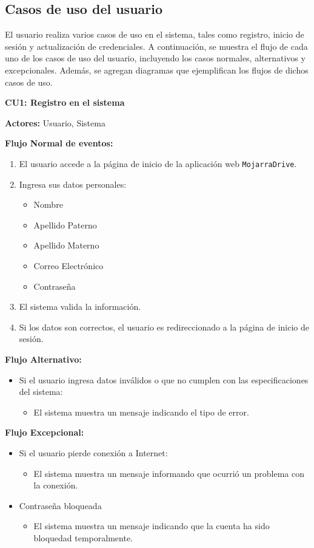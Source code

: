 \subsection{Casos de uso del usuario}
El usuario realiza varios casos de uso en el sistema, tales como registro, inicio de sesión y actualización de credenciales. A continuación, se muestra el flujo de cada uno de los casos de uso del usuario, incluyendo los casos normales, alternativos y excepcionales. Además, se agregan diagramas que ejemplifican los flujos de dichos casos de uso.

\textbf{\large CU1: Registro en el sistema} \

\textbf{Actores:} Usuario, Sistema \

\textbf{Flujo Normal de eventos:}
\begin{enumerate}
\item El usuario accede a la página de inicio de la aplicación web \texttt{MojarraDrive}.
\item Ingresa sus datos personales:
\begin{itemize}
\item Nombre
\item Apellido Paterno
\item Apellido Materno
\item Correo Electrónico
\item Contraseña
\end{itemize}
\item El sistema valida la información.
\item Si los datos son correctos, el usuario es redireccionado a la página de inicio de sesión.
\end{enumerate}

\textbf{Flujo Alternativo:}
\begin{itemize}
\item Si el usuario ingresa datos inválidos o que no cumplen con las especificaciones del sistema:
\begin{itemize}
\item El sistema muestra un mensaje indicando el tipo de error.
\end{itemize}
\end{itemize}

\textbf{Flujo Excepcional:}
\begin{itemize}
\item Si el usuario pierde conexión a Internet:
\begin{itemize}
\item El sistema muestra un mensaje informando que ocurrió un problema con la conexión.
\end{itemize}
\item Contraseña bloqueada
\begin{itemize}
    \item El sistema muestra un mensaje indicando que la cuenta ha sido bloquedad temporalmente.
\end{itemize}
\end{itemize}

